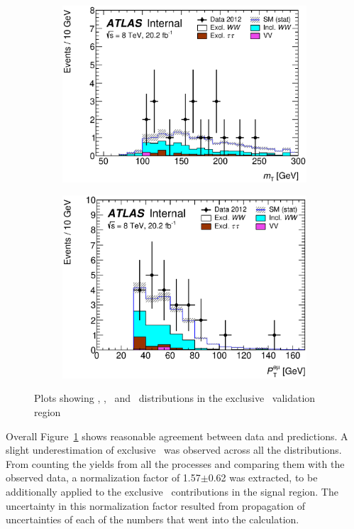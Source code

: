 \begin{figure}[!h]
\begin{subfigure}{0.5\textwidth}
   \includegraphics[width=\textwidth]{figures/emme-CutExcl1mm-MT-lin.eps}
\end{subfigure} 
\begin{subfigure}{0.5\textwidth}
   \includegraphics[width=\textwidth]{figures/emme-CutExcl1mm-Ptll-lin.eps}
\end{subfigure} 
\caption{Plots showing \memu, \dFem, \mT\ and \pTemu\ distributions in the exclusive \WW\ validation region}
\label{fig:exclWWCR}
\end{figure}

\par Overall Figure~\ref{fig:exclWWCR} shows reasonable agreement between data and 
predictions. A slight underestimation of exclusive \WW\ was observed across all the 
distributions. From counting the yields from all the processes and comparing them 
with the observed data, a normalization factor of 1.57$\pm$0.62 was extracted, to 
be additionally applied to the exclusive \WW\ contributions in the signal region. 
The uncertainty in this normalization factor resulted from propagation of 
uncertainties of each of the numbers that went into the calculation. 

